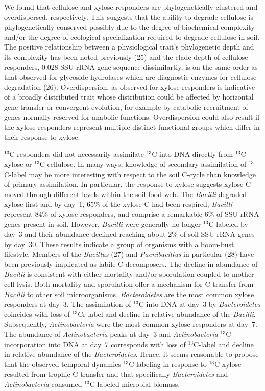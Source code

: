 We found that cellulose and xylose responders are phylogenetically clustered
and overdispersed, respectively. This suggests that the ability to degrade
cellulose is phylogenetically conserved possibly due to the degree of
biochemical complexity and/or the degree of ecological specialization required
to degrade cellulose in soil. The positive relationship between a physiological
trait’s phylogenetic depth and its complexity has been noted previously (25)
and the clade depth of cellulose responders, 0.028 SSU rRNA gene sequence
dissimilartiy, is on the same order as that observed for glycoside hydrolases
which are diagnostic enzymes for cellulose degradation (26). Overdispersion, as
observed for xylose responders is indicative of a broadly distributed trait
whose distribution could be affected by horizontal gene transfer or convergent
evolution, for example by catabolic recruitment of genes normally reserved for
anabolic functions. Overdispersion could also result if the xylose responders
represent multiple distinct functional groups which differ in their response to
xylose. 

$^{13}$C-responders did not necessarily assimilate $^{13}$C into DNA directly
from $^{13}$C-xylose or $^{13}$C-cellulose. In many ways, knowledge of
secondary assimilation of $^{13}$C-label may be more interesting with respect
to the soil C-cycle than knowledge of primary assimilation. In particular, the
response to xylose suggests xylose C moved through different levels within the
soil food web. The \textit{Bacilli} degraded xylose first and by day~1, 65\% of
the xylose-C had been respired, \textit{Bacilli} represent 84\% of xylose
responders, and comprise a remarkable 6\% of SSU rRNA genes present in soil.
However, \textit{Bacilli} were generally no longer $^{13}$C-labeled by day~3
and their abundance declined reaching about 2\% of soil SSU rRNA genes by
day~30. These results indicate a group of organisms with a boom-bust
lifestyle. Members of the \textit{Bacillus} (27) and \textit{Paenibacillus} in
particular (28) have been previously implicated as labile C decomposers. The
decline in abundance of \textit{Bacilli} is consistent with either mortality
and/or sporulation coupled to mother cell lysis. Both mortality and sporulation
offer a mechanism for C transfer from \textit{Bacilli} to other soil
microorganisms. \textit{Bacteroidetes} are the most common xylose responders at
day~3. The assimilation of  $^{13}$C into DNA at day~3 by
\textit{Bacteroidetes} coincides with loss of $^{13}$Cr-label and decline in
relative abundance of the \textit{Bacilli}. Subsequently,
\textit{Actinobacteria} were the most common xylose responders at day~7. The
abundance of \textit{Actinobacteria} peaks at day~3 and \textit{Actinobacteria}
$^{13}$C-incorporation into DNA at day~7 corresponds with loss of
$^{13}$C-label and decline in relative abundance of the \textit{Bacteroidetes}.
Hence, it seems reasonable to propose that the observed temporal dynamics
$^{13}$C-labeling in response to $^{13}$C-xylose resulted from trophic
C transfer and that specifically \textit{Bacteroidetes} and
\textit{Actinobacteria} consumed $^{13}$C-labeled microbial biomass. 

